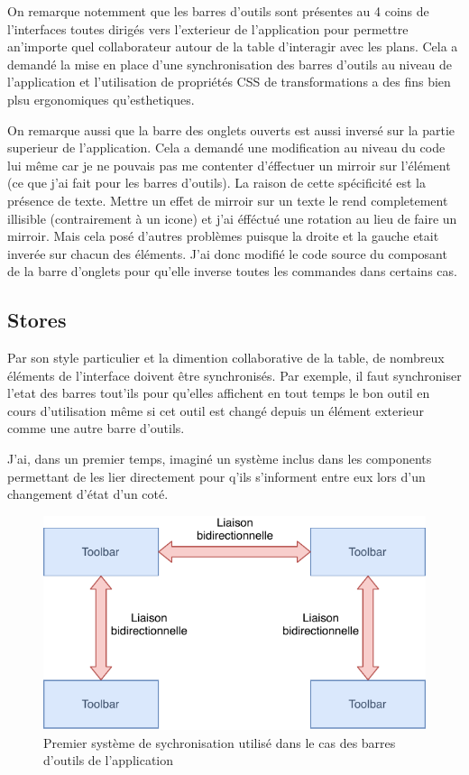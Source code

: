 On remarque notemment que les barres d'outils sont présentes au 4 coins de l'interfaces toutes dirigés vers l'exterieur de l'application pour permettre an'importe quel collaborateur autour de la table d'interagir avec les plans.
Cela a demandé la mise en place d'une synchronisation des barres d'outils au niveau de l'application et l'utilisation de propriétés CSS de transformations a des fins bien plsu ergonomiques qu'esthetiques.

\bigskip

On remarque aussi que la barre des onglets ouverts est aussi inversé sur la partie superieur de l'application.
Cela a demandé une modification au niveau du code lui même car je ne pouvais pas me contenter d'éffectuer un mirroir sur l'élément (ce que j'ai fait pour les barres d'outils).
La raison de cette spécificité est la présence de texte.
Mettre un effet de mirroir sur un texte le rend completement illisible (contrairement à un icone) et j'ai éfféctué une rotation au lieu de faire un mirroir.
Mais cela posé d'autres problèmes puisque la droite et la gauche etait inverée sur chacun des éléments.
J'ai donc modifié le code source du composant de la barre d'onglets pour qu'elle inverse toutes les commandes dans certains cas.

\subsection{Stores}
\label{eiffageTablePlanStores}

Par son style particulier et la dimention collaborative de la table, de nombreux éléments de l'interface doivent être synchronisés.
Par exemple, il faut synchroniser l'etat des barres tout'ils pour qu'elles affichent en tout temps le bon outil en cours d'utilisation même si cet outil est changé depuis un élément exterieur comme une autre barre d'outils.

J'ai, dans un premier temps, imaginé un système inclus dans les components permettant de les lier directement pour q'ils s'informent entre eux lors d'un changement d'état d'un coté.

\begin{figure}[h]
    \centering
    \includegraphics[scale=1]{img/premiere-synchro.pdf}
    \caption{Premier système de sychronisation utilisé dans le cas des barres d'outils de l'application}
\end{figure}

